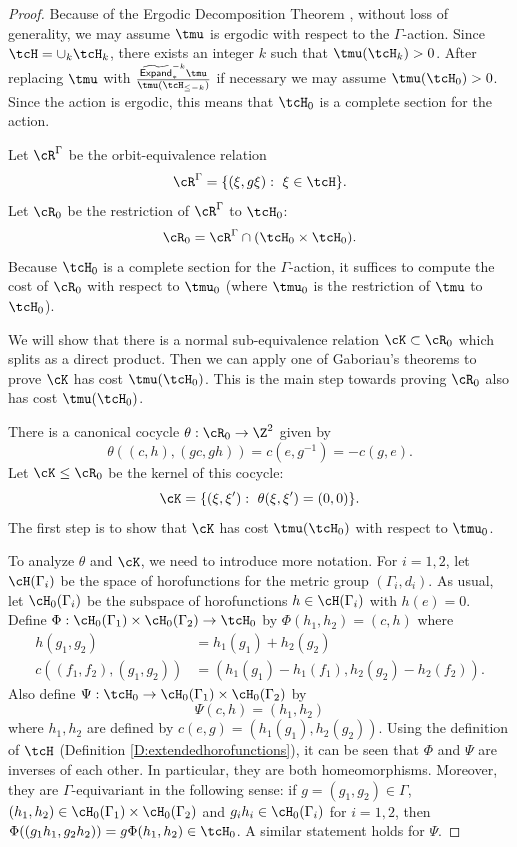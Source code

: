 \documentclass[12pt]{article}
\theoremstyle{plain}
\theoremstyle{definition}
\theoremstyle{remark}
\newcommand{\G}{\Gamma}
\newcommand\Expand{{\mathsf{Expand}}}
\begin{document}
\begin{proof}
Because of the Ergodic Decomposition Theorem \cite{MR1784210}, without loss of generality, we may assume $\tmu$ is ergodic with respect to the $\G$-action. Since $\tcH=\cup_k \tcH_k$, there exists an integer $k$ such that $\tmu(\tcH_k)>0$. After replacing $\tmu$ with $\frac{\widetilde{\Expand}^{-k}_*\tmu}{\tmu(\tcH_{\le -k})}$ if necessary we may assume $\tmu(\tcH_0)>0$. Since the action is ergodic, this means that $\tcH_0$ is a complete section for the action.

Let $\cR^\G$ be the orbit-equivalence relation 
$$\cR^\G=\{(\xi, g\xi):~\xi \in \tcH\}.$$
Let $\cR_0$ be the restriction of $\cR^\G$ to $\tcH_0$:
$$\cR_0=\cR^\G\cap (\tcH_0\times \tcH_0).$$
Because $\tcH_0$ is a complete section for the $\G$-action, it suffices to compute the cost of $\cR_0$ with respect to $\tmu_0$ (where $\tmu_0$ is the restriction of $\tmu$ to $\tcH_0$).

We will show that there is a normal sub-equivalence relation $\cK \subset \cR_0$ which splits as a direct product. Then we can apply one of Gaboriau's theorems to prove $\cK$ has cost $\tmu(\tcH_0)$. This is the main step towards proving $\cR_0$ also has cost $\tmu(\tcH_0)$.

There is a canonical cocycle $\theta:\cR_0 \to \Z^2$ given by 
$$\theta( (c,h), (gc,gh) ) =c(e,g^{-1})=-c(g,e).$$
Let $\cK \le \cR_0$ be the kernel of this cocycle:
$$\cK=\{(\xi, \xi'):~\theta(\xi,\xi')=(0,0)\}.$$
The first step is to show that $\cK$ has cost $\tmu(\tcH_0)$ with respect to $\tmu_0$. %

To analyze $\theta$ and $\cK$, we need to introduce more notation. For $i=1,2$, let $\cH(\G_i)$ be the space of horofunctions for the metric group $(\G_i,d_i)$. As usual, let $\cH_0(\G_i)$ be the subspace of horofunctions $h \in \cH(\G_i)$ with $h(e)=0$. Define $\Phi:\cH_0(\G_1)\times \cH_0(\G_2) \to \tcH_0$ by $\Phi(h_1,h_2)=(c,h)$ where 
\begin{align*}
    h(g_1,g_2) &= h_1(g_1) + h_2(g_2) \\
    c( (f_1,f_2), (g_1,g_2)) &= (h_1(g_1)-h_1(f_1), h_2(g_2) - h_2(f_2)).
\end{align*}
Also define $\Psi:\tcH_0 \to \cH_0(\G_1)\times \cH_0(\G_2)$ by 
$$\Psi(c,h)=(h_1,h_2)$$
where $h_1,h_2$ are defined by $c(e,g)=(h_1(g_1),h_2(g_2))$. Using the definition of $\tcH$ (Definition \ref{D:extendedhorofunctions}), it can be seen that $\Phi$ and $\Psi$ are inverses of each other. In particular, they are both homeomorphisms. Moreover, they are $\G$-equivariant in the following sense: if $g=(g_1,g_2) \in \G$, $(h_1,h_2)\in \cH_0(\G_1)\times \cH_0(\G_2)$ and $g_ih_i \in \cH_0(\G_i)$ for $i=1,2$, then $\Phi((g_1h_1,g_2h_2))=g\Phi(h_1,h_2) \in \tcH_0$. A similar statement holds for $\Psi$. 



\end{proof}
\end{document}
